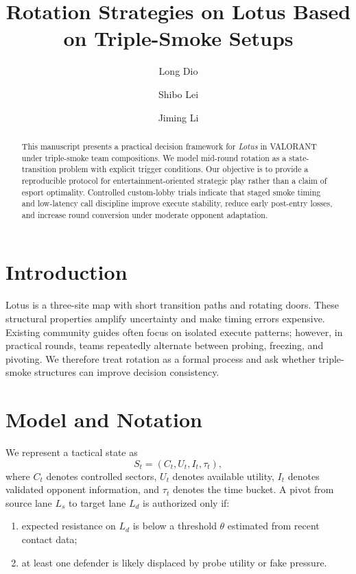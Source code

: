 \documentclass[runningheads]{llncs}
\title{Rotation Strategies on Lotus Based on Triple-Smoke Setups}
\author{Long Dio \and Shibo Lei \and Jiming Li}
\institute{Entertainment Strategy Research Group\\
\email{contact@example.com}}
\begin{document}
\maketitle

\begin{abstract}
This manuscript presents a practical decision framework for \emph{Lotus} in VALORANT under triple-smoke team compositions. We model mid-round rotation as a state-transition problem with explicit trigger conditions. Our objective is to provide a reproducible protocol for entertainment-oriented strategic play rather than a claim of esport optimality. Controlled custom-lobby trials indicate that staged smoke timing and low-latency call discipline improve execute stability, reduce early post-entry losses, and increase round conversion under moderate opponent adaptation.
\end{abstract}

\section{Introduction}
Lotus is a three-site map with short transition paths and rotating doors. These structural properties amplify uncertainty and make timing errors expensive. Existing community guides often focus on isolated execute patterns; however, in practical rounds, teams repeatedly alternate between probing, freezing, and pivoting. We therefore treat rotation as a formal process and ask whether triple-smoke structures can improve decision consistency.

\section{Model and Notation}
We represent a tactical state as
\[
S_t = (C_t, U_t, I_t, \tau_t),
\]
where $C_t$ denotes controlled sectors, $U_t$ denotes available utility, $I_t$ denotes validated opponent information, and $\tau_t$ denotes the time bucket.
A pivot from source lane $L_s$ to target lane $L_d$ is authorized only if:
\begin{enumerate}
\item expected resistance on $L_d$ is below a threshold $\theta$ estimated from recent contact data;
\item at least one defender is likely displaced by probe utility or fake pressure.
\end{enumerate}
\end{document}

